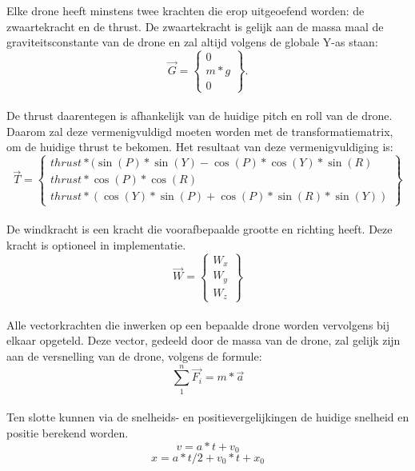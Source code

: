 \\
\\
Elke drone heeft minstens twee krachten die erop uitgeoefend worden: de zwaartekracht en de thrust. De zwaartekracht is gelijk aan de massa maal de graviteitsconstante van de drone en zal altijd volgens de globale Y-as staan: \\
\begin{equation*} 
\vec{G} =
\begin{Bmatrix}
0 \\
m * g \\
0 
\end{Bmatrix}.
\end{equation*} 
\\
De thrust daarentegen is afhankelijk van de huidige pitch en roll van de drone. Daarom zal deze vermenigvuldigd moeten worden met de transformatiematrix, om de huidige thrust te bekomen. Het resultaat van deze vermenigvuldiging is: 
\begin{equation*} 
\vec{T} = 
\begin{Bmatrix}
thrust*(\sin(P)*\sin(Y) - \cos(P)*\cos(Y)*\sin(R)\\ 
thrust*\cos(P)*\cos(R) \\
thrust*(\cos(Y)*\sin(P) + \cos(P)*\sin(R)*\sin(Y))
\end{Bmatrix}
\end{equation*}
\\
De windkracht is een kracht die voorafbepaalde grootte en richting heeft. Deze kracht is optioneel in implementatie. \\
\begin{equation*}
\vec{W} = 
\begin{Bmatrix}
W_x \\
W_y \\
W_z 
\end{Bmatrix}
\end{equation*}
\\
Alle vectorkrachten die inwerken op een bepaalde drone worden vervolgens bij elkaar opgeteld. Deze vector, gedeeld door de massa van de drone, zal gelijk zijn aan de versnelling van de drone, volgens de formule: \\
\begin{equation*}
	\sum_{1}^{n} \vec{F_i} = m * \vec{a} 
\end{equation*}
\\
Ten slotte kunnen via de snelheids- en positievergelijkingen de huidige snelheid en positie berekend worden. \\
\begin{equation*}
v = a*t + v_0
\end{equation*} 
\begin{equation*}
x = a*t/2 + v_0*t + x_0
\end{equation*}

